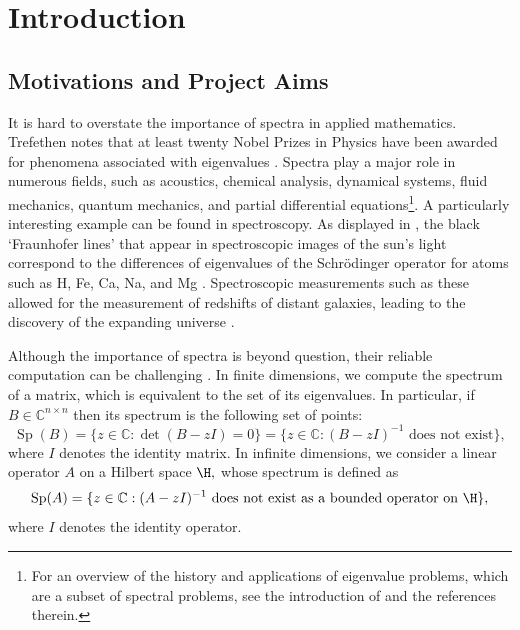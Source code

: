 \chapter{Introduction}

\section{Motivations and  Project Aims}

It is hard to overstate the importance of spectra in applied mathematics. Trefethen notes that at least twenty Nobel Prizes in Physics have been awarded for phenomena associated with eigenvalues \cite{NickEssay}.
Spectra play a major role in numerous fields, such as acoustics, chemical analysis, dynamical systems, fluid mechanics, quantum mechanics, and partial differential equations\footnote{For an overview of the history and applications of eigenvalue problems, which are a subset of spectral problems, see the introduction of \cite{Nick} and the references therein.}. A particularly interesting example can be found in spectroscopy. As displayed in , the black `Fraunhofer lines' that appear in spectroscopic images of the sun's light correspond to the differences of eigenvalues of the Schrödinger operator for atoms such as H, Fe, Ca, Na, and Mg \cite{Nick}. Spectroscopic measurements such as these allowed for the measurement of redshifts of distant galaxies, leading to the discovery of the expanding universe \cite{Nick}.


Although the importance of spectra is beyond question, their reliable computation can be challenging \cite{Forward}. In finite dimensions, we compute the spectrum of a matrix, which is equivalent to the set of its eigenvalues.  In particular, if $B \in \mathbb{C}^{n\times n}$ then its spectrum is the following set of points:
\begin{equation} \label{matrix spec}
    \operatorname{Sp}(B) = \{z \in \mathbb{C}: \det (B-zI) = 0 \} = \{z \in \mathbb{C}: (B-zI)^{-1} \text{ does not exist} \},
\end{equation}
where $I$ denotes the identity matrix. 
In infinite dimensions, we consider a linear operator $A$ on a Hilbert space $\H,$ whose spectrum is defined as
\begin{equation} \label{SpA}
    \operatorname{Sp}(A) = \{z \in \mathbb{C}: (A-zI)^{-1} \text{ does not exist as a bounded operator on } \H \},
\end{equation}
where $I$ denotes the identity operator. 

